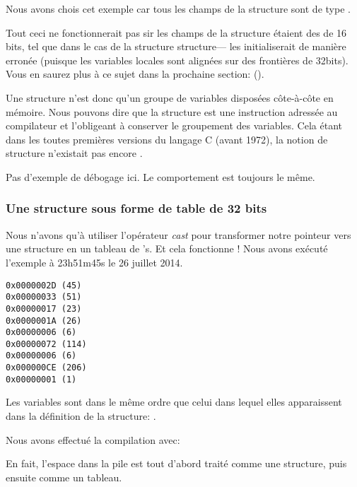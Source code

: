 Nous avons chois cet exemple car tous les champs de la structure sont de type \Tint.%

Tout ceci ne fonctionnerait pas sir les champs de la structure étaient des  de 16 bits, tel 
que dans le cas de la structure  structure--- les initialiserait 
de manière erronée (puisque les variables locales sont alignées sur des frontières de 32bits).
Vous en saurez plus à ce sujet dans la prochaine section: 
\q{\StructurePackingSectionName} ().

Une structure n'est donc qu'un groupe de variables disposées côte-à-côte en mémoire. Nous pouvons 
dire que la structure est une instruction adressée au compilateur et l'obligeant à conserver le 
groupement des variables.
Cela étant dans les toutes premières versions du langage C (avant 1972), la notion de structure 
n'existait pas encore \RitchieDevC.

Pas d'exemple de débogage ici. Le comportement est toujours le même.

\subsubsection{Une structure sous forme de table de 32 bits}



Nous n'avons qu'à utiliser l'opérateur \emph{cast} pour transformer notre pointeur vers une structure 
en un tableau de \Tint{}'s. Et cela fonctionne !
Nous avons exécuté l'exemple à 23h51m45s le 26 juillet 2014.

\begin{lstlisting}[label=GCC_tm3_output]
0x0000002D (45)
0x00000033 (51)
0x00000017 (23)
0x0000001A (26)
0x00000006 (6)
0x00000072 (114)
0x00000006 (6)
0x000000CE (206)
0x00000001 (1)
\end{lstlisting}

Les variables sont dans le même ordre que celui dans lequel elles apparaissent dans la définition 
de la structure: .

Nous avons effectué la compilation avec:



En fait, l'espace dans la pile est tout d'abord traité comme une structure, puis ensuite comme un 
tableau.

